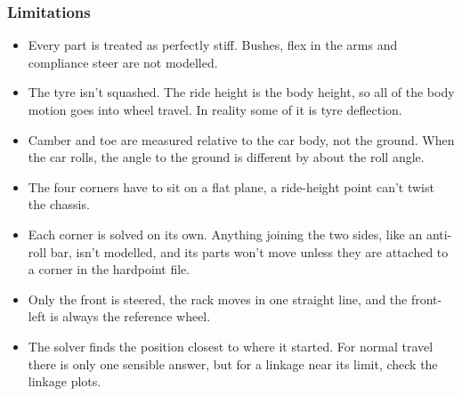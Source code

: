 \subsubsection{Limitations}
\begin{itemize}
    \item Every part is treated as perfectly stiff. Bushes, flex in the arms and compliance steer are not modelled.

    \item The tyre isn't squashed. The ride height is the body height, so all of the body motion goes into wheel travel. In reality some of it is tyre deflection.

    \item Camber and toe are measured relative to the car body, not the ground. When the car rolls, the angle to the ground is different by about the roll angle.

    \item The four corners have to sit on a flat plane, a ride-height point can't twist the chassis.

    \item Each corner is solved on its own. Anything joining the two sides, like an anti-roll bar, isn't modelled, and its parts won't move unless they are attached to a corner in the hardpoint file.

    \item Only the front is steered, the rack moves in one straight line, and the front-left is always the reference wheel.

    \item The solver finds the position closest to where it started. For normal travel there is only one sensible answer, but for a linkage near its limit, check the linkage plots.
\end{itemize}
